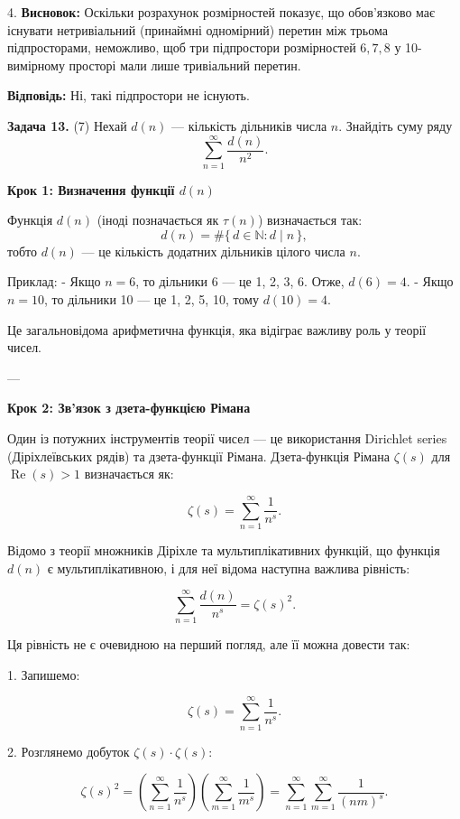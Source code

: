 \documentclass{article}
\begin{document}
4. \textbf{Висновок:}  
   Оскільки розрахунок розмірностей показує, що обов’язково має існувати нетривіальний (принаймні одномірний) перетин між трьома підпросторами, неможливо, щоб три підпростори розмірностей \(6, 7, 8\) у 10-вимірному просторі мали лише тривіальний перетин.

\textbf{Відповідь:} Ні, такі підпростори не існують.


\bigskip

\noindent\textbf{Задача 13.} (7) Нехай \( d(n) \) — кількість дільників числа \( n \). Знайдіть суму ряду
\[
\sum_{n=1}^{\infty} \frac{d(n)}{n^2}.
\]

\textbf{Крок 1: Визначення функції \( d(n) \)}

Функція \( d(n) \) (іноді позначається як \(\tau(n)\)) визначається так:  
\[
d(n) = \#\{\,d \in \mathbb{N} : d \mid n\,\},
\]
тобто \( d(n) \) — це кількість додатних дільників цілого числа \( n \).

Приклад:  
- Якщо \( n = 6 \), то дільники 6 — це 1, 2, 3, 6. Отже, \( d(6) = 4 \).  
- Якщо \( n = 10 \), то дільники 10 — це 1, 2, 5, 10, тому \( d(10) = 4 \).

Це загальновідома арифметична функція, яка відіграє важливу роль у теорії чисел.

---

\textbf{Крок 2: Зв’язок з дзета-функцією Рімана}

Один із потужних інструментів теорії чисел — це використання Dirichlet series (Діріхлеївських рядів) та дзета-функції Рімана. Дзета-функція Рімана \(\zeta(s)\) для \(\operatorname{Re}(s) > 1\) визначається як:

\[
\zeta(s) = \sum_{n=1}^{\infty} \frac{1}{n^s}.
\]

Відомо з теорії множників Діріхле та мультиплікативних функцій, що функція \( d(n) \) є мультиплікативною, і для неї відома наступна важлива рівність:

\[
\sum_{n=1}^{\infty} \frac{d(n)}{n^s} = \zeta(s)^2.
\]

Ця рівність не є очевидною на перший погляд, але її можна довести так:

1. Запишемо:

   \[
   \zeta(s) = \sum_{n=1}^{\infty} \frac{1}{n^s}.
   \]

2. Розглянемо добуток \(\zeta(s) \cdot \zeta(s)\):

   \[
   \zeta(s)^2 = \left(\sum_{n=1}^{\infty} \frac{1}{n^s}\right)\left(\sum_{m=1}^{\infty} \frac{1}{m^s}\right) = \sum_{n=1}^{\infty}\sum_{m=1}^{\infty} \frac{1}{(nm)^s}.
   \]
\end{document}
